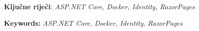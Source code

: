 \documentclass[12pt, a4paper]{article}
\begin{document}



\noindent\textbf{Ključne riječi}: \textit{ASP.NET Core, Docker, Identity, RazorPages}



\noindent\textbf{Keywords:} \textit{ASP.NET Core, Docker, Identity, RazorPages}
\newpage
{}


\newpage


\newpage


\newpage

\newpage


\newpage
{}



\newpage
\clearpage
\pagestyle{empty}

\begin{appendices}
\appendix

\listoffigures
\listoftables
\lstlistoflistings
\end{appendices}
\end{document}
